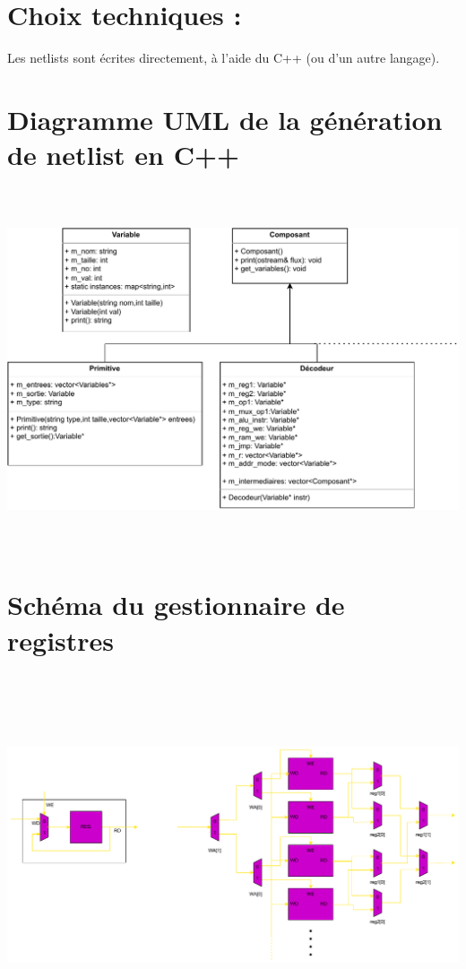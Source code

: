 \documentclass{article}
\begin{document}
    \section{Choix techniques :}
    Les netlists sont écrites directement, à l'aide du C++ (ou d'un autre langage).
		\section{Diagramme UML de la génération de netlist en C++}
		\includegraphics[width=14.8cm,height=10.6cm,page=1]{uml.pdf}	
		\section{Schéma du gestionnaire de registres}
		\includegraphics[width=14.8cm,height=10.6cm,page=1]{gestionnaire_registres.pdf}
\end{document}
